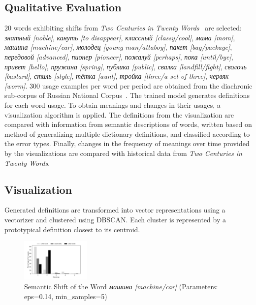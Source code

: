 \documentclass[a0,portrait]{a0poster}
\begin{document}
\begin{multicols}{2}
\section*{Qualitative Evaluation}

20 words exhibiting shifts from \textit{Two Centuries in Twenty Words}~\cite{TwoCenturies} are selected:
\textit{знатный [noble]}, \textit{кануть [to disappear]}, \textit{классный [classy/cool]}, \textit{мама [mom]}, \textit{машина [machine/car]},
\textit{молодец [young man/attaboy]}, \textit{пакет [bag/package]}, \textit{передовой [advanced]}, \textit{пионер [pioneer]},
\textit{пожалуй [perhaps]}, \textit{пока [until/bye]}, \textit{привет [hello]}, \textit{пружина [spring]}, \textit{публика [public]},
\textit{свалка [landfill/fight]}, \textit{сволочь [bastard]}, \textit{стиль [style]},
\textit{тётка [aunt]}, \textit{тройка [three/a set of three]}, \textit{червяк [worm]}.
300 usage examples per word per period are obtained from the diachronic sub-corpus of Russian National Corpus~\cite{Ruscorpora}.
The trained model generates definitions for each word usage.
To obtain meanings and changes in their usages, a visualization algorithm is applied.
The definitions from the visualization are compared with information from semantic descriptions of words,
written based on  method of generalizing multiple dictionary definitions,
and classified according to the error types.
Finally, changes in the frequency of meanings over time provided by the visualizations are compared with historical data from \textit{Two Centuries in Twenty Words}.

\subsection*{Visualization}

Generated definitions are transformed into vector representations using a vectorizer and clustered using DBSCAN.
Each cluster is represented by a prototypical definition closest to its centroid.

\begin{figure}[H]
    \centering
    \includegraphics[width=0.3\textwidth]{img/mashina_minimal}
    \caption{Semantic Shift of the Word \textit{машина [machine/car]} (Parameters: eps=0.14, min\_samples=5)}
    \label{fig:Машина_example}
\end{figure}


\end{multicols}
\end{document}
